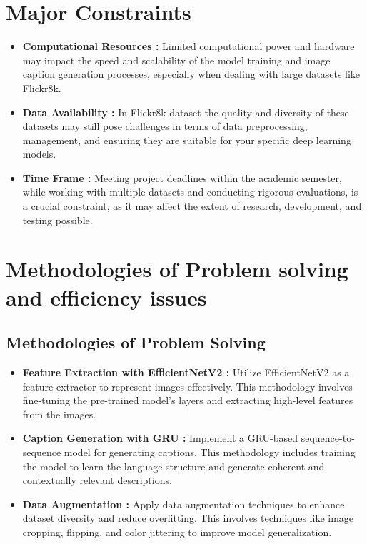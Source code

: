 \documentclass[oneside,a4paper,12pt]{report}
\begin{document}
\section{Major Constraints}
\begin{itemize}
\item \textbf{Computational Resources :} Limited computational power and hardware may impact the speed and scalability of the model training and image caption generation processes, especially when dealing with large datasets like Flickr8k.
\item\textbf{ Data Availability :} In Flickr8k dataset the quality and diversity of these datasets may still pose challenges in terms of data preprocessing, management, and ensuring they are suitable for your specific deep learning models.
\item \textbf{Time Frame :} Meeting project deadlines within the academic semester, while working with multiple datasets and conducting rigorous evaluations, is a crucial constraint, as it may affect the extent of research, development, and testing possible.
\end{itemize}

\section{Methodologies of Problem solving and efficiency issues}
\subsection{Methodologies of Problem Solving}
\begin{itemize}

	\item\textbf{ Feature Extraction with EfficientNetV2 :} Utilize EfficientNetV2 as a feature extractor to represent images effectively. This methodology involves fine-tuning the pre-trained model's layers and extracting high-level features from the images.
	\item \textbf{Caption Generation with GRU :} Implement a GRU-based sequence-to-sequence model for generating captions. This methodology includes training the model to learn the language structure and generate coherent and contextually relevant descriptions.
	\item\textbf{ Data Augmentation :} Apply data augmentation techniques to enhance dataset diversity and reduce overfitting. This involves techniques like image cropping, flipping, and color jittering to improve model generalization.
\end{itemize}
\end{document}
